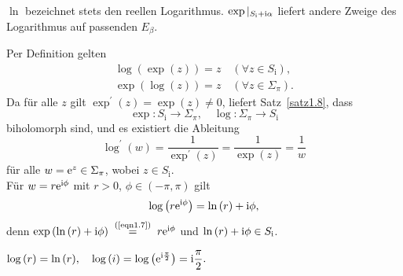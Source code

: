 \documentclass[a4paper,twoside,DIV15,BCOR12mm]{scrbook}
\begin{document}
\begin{bem*}
  $\ln$ bezeichnet stets den reellen Logarithmus. $\exp|_{S_\text{i}+\mathrm{i}\alpha}$ liefert andere Zweige des Logarithmus auf
  passenden $E_\beta$.
\end{bem*}

\noindent Per Definition gelten
\begin{gather*}
  \log{(\exp{(z)})} = z \quad (\forall z \in S_\text{i}),\\
  \exp{(\log{(z)})} = z \quad (\forall z \in \Sigma_\pi).
\end{gather*}
Da für alle $z$ gilt $\exp^\prime{(z)} = \exp{(z)} \neq 0$, liefert Satz~\ref{satz1.8}, dass
\[\exp\colon S_\text{i} \to \Sigma_\pi, \quad \log\colon \Sigma_\pi \to S_\text{i}\]
biholomorph sind, und es existiert die Ableitung
\[\log^\prime{(w)} = \frac{1}{\exp^\prime{(z)}} = \frac{1}{\exp{(z)}} = \frac1w\]
für alle $w=\mathrm{e}^z \in \Sigma_\pi$, wobei $z\in S_\text{i}$.\\
Für $w=r\mathrm{e}^{\mathrm{i}\phi}$ mit $r>0$, $\phi\in(-\pi,\pi)$ gilt
\begin{equation} \label{eqn1.9}
\log{\left(r\mathrm{e}^{\mathrm{i}\phi}\right)} = \ln{(r)} + \mathrm{i}\phi,
\end{equation}
denn $\exp{(\ln{(r)} + \i\phi)} \nach{=}{(\ref{eqn1.7})} r\e^{\i\phi}$ und $\ln{(r)}+\mathrm{i}\phi \in S_\text{i}$.

\begin{bsp*}
  $\displaystyle \log{(r)} = \ln{(r)}, \quad \log{(i)} = \log{\left(\mathrm{e}^{\mathrm{i}\frac\pi2}\right)} = \mathrm{i}\frac\pi2.$
\end{bsp*}
\end{document}
